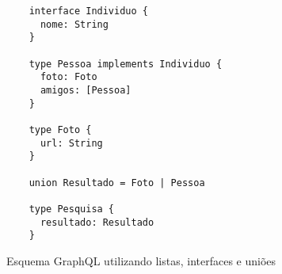 \begin{figure}[H]
  \centering
  \begin{verbatim}
    interface Individuo {
      nome: String
    }

    type Pessoa implements Individuo {
      foto: Foto
      amigos: [Pessoa]
    }

    type Foto {
      url: String
    }

    union Resultado = Foto | Pessoa

    type Pesquisa {
      resultado: Resultado
    }
  \end{verbatim}
  \caption{Esquema GraphQL utilizando listas, interfaces e uniões}
\end{figure}

